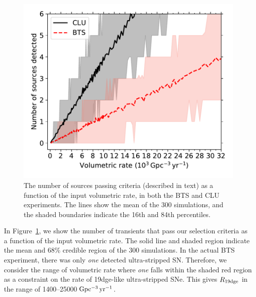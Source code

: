 \documentclass[twocolumn]{aastex63}
\begin{document}
\begin{CJK*}{UTF8}{gbsn}
\begin{figure}[htbp!]
	\centering
	\includegraphics[width=\columnwidth]{figures/SN2019dge_rate_pct.pdf}
	\caption{The number of sources passing criteria (described in text) as a 
		function of the input volumetric rate, in both the BTS and CLU experiments. The lines show the 
		mean of the 300 simulations, and the shaded boundaries indicate the 16th and 84th percentiles. 
		\label{fig:rate}}
\end{figure}

In Figure~\ref{fig:rate}, we show the number of transients that pass our selection criteria as a function 
of the input volumetric rate. The solid line and shaded region indicate the mean and 68\% credible 
region of the 300 simulations. In the actual BTS experiment, there was only \textit{one} detected 
ultra-stripped SN. Therefore, we consider the range of volumetric rate where \textit{one} falls within 
the shaded red region as a constraint on the rate of 19dge-like ultra-stripped SNe. 
This gives $R_{\rm 19dge}$ in the range of 1400--25000\,${\rm Gpc^{-3}\,yr^{-1}}$. 


\end{CJK*}
\end{document}
